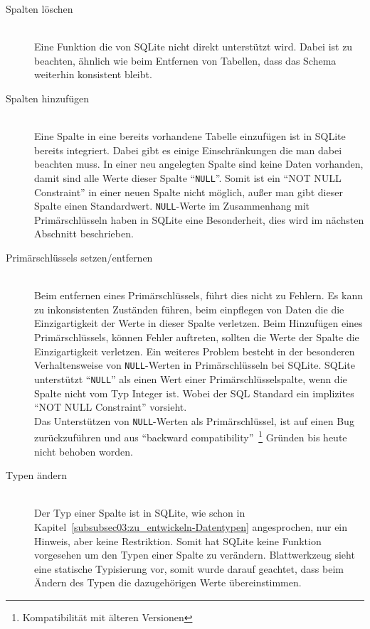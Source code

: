 \begin{description}
\item[Spalten löschen] \hfill\\
Eine Funktion die von SQLite nicht direkt unterstützt wird. Dabei ist zu beachten, ähnlich wie beim Entfernen von Tabellen, dass das Schema weiterhin konsistent bleibt.

\item[Spalten hinzufügen] \hfill\\
Eine Spalte in eine bereits vorhandene Tabelle einzufügen ist in SQLite bereits integriert.
Dabei gibt es einige Einschränkungen die man dabei beachten muss. In einer neu angelegten Spalte sind keine Daten vorhanden, damit sind alle Werte dieser Spalte ``\texttt{NULL}''.
Somit ist ein ``NOT NULL Constraint'' in einer neuen Spalte nicht möglich, außer man gibt dieser Spalte einen Standardwert. \texttt{NULL}-Werte im Zusammenhang mit Primärschlüsseln haben in SQLite eine Besonderheit, dies wird im nächsten Abschnitt beschrieben.

\item[Primärschlüssels setzen/entfernen] \hfill\\
Beim entfernen eines Primärschlüssels, führt dies nicht zu Fehlern. Es kann zu inkonsistenten Zuständen führen, beim einpflegen von Daten die die Einzigartigkeit der Werte in dieser Spalte verletzen.
Beim Hinzufügen eines Primärschlüssels, können Fehler auftreten, sollten die Werte der Spalte die Einzigartigkeit verletzen.
Ein weiteres Problem besteht in der besonderen Verhaltensweise von \texttt{NULL}-Werten in Primärschlüsseln bei SQLite.
SQLite unterstützt ``\texttt{NULL}'' als einen Wert einer Primärschlüsselspalte, wenn die Spalte nicht vom Typ Integer ist. Wobei der SQL Standard ein implizites ``NOT NULL Constraint'' vorsieht.\\
Das Unterstützen von \texttt{NULL}-Werten als Primärschlüssel, ist auf einen Bug zurückzuführen und aus ``backward compatibility''~\footnote{Kompatibilität mit älteren Versionen} Gründen bis heute nicht behoben worden.\cite{sqlite_doc_alter}

\item[Typen ändern] \hfill\\
Der Typ einer Spalte ist in SQLite, wie schon in Kapitel~\ref{subsubsec03:zu_entwickeln-Datentypen} angesprochen, nur ein Hinweis, aber keine Restriktion. Somit hat SQLite keine Funktion vorgesehen um den Typen einer Spalte zu verändern. Blattwerkzeug sieht eine statische Typisierung vor, somit wurde darauf geachtet, dass beim Ändern des Typen die dazugehörigen Werte übereinstimmen.


\end{description}
